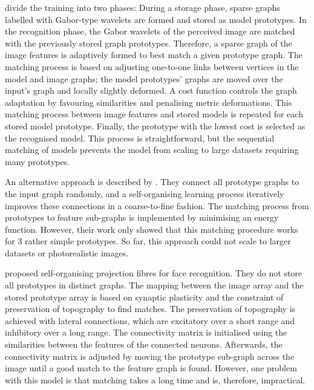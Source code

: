  divide the training into two phases: During a storage phase, sparse graphs labelled with Gabor-type wavelets are formed and stored as model prototypes. In the recognition phase, the Gabor wavelets of the perceived image are matched with the previously stored graph prototypes.
Therefore, a sparse graph of the image features is adaptively formed to best match a given prototype graph. The matching process is based on adjusting one-to-one links between vertices in the model and image graphs; the model prototypes' graphs are moved over the input's graph and locally slightly deformed. A cost function controls the graph adaptation by favouring similarities and penalising metric deformations. This matching process between image features and stored models is repeated for each stored model prototype. Finally, the prototype with the lowest cost is selected as the recognised model. This process is straightforward, but the sequential matching of models prevents the model from scaling to large datasets requiring many prototypes.

An alternative approach is described by . They connect all prototype graphs to the input graph randomly, and a self-organising learning process iteratively improves these connections in a coarse-to-fine fashion.
The matching process from prototypes to feature sub-graphs is implemented by minimising an energy function.
However, their work only showed that this matching procedure works for $3$ rather simple prototypes.
So far, this approach could not scale to larger datasets or photorealistic images.

 proposed self-organising projection fibres for face recognition. They do not store all prototypes in distinct graphs. The mapping between the image array and the stored prototype array is based on synaptic plasticity and the constraint of preservation of topography to find matches. The preservation of topography is achieved with lateral connections, which are excitatory over a short range and inhibitory over a long range.
The connectivity matrix is initialised using the similarities between the features of the connected neurons. Afterwards, the connectivity matrix is adjusted by moving the prototype sub-graph across the image until a good match to the feature graph is found.
However, one problem with this model is that matching takes a long time and is, therefore, impractical.

